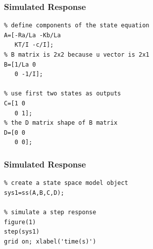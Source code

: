 \documentclass[fleqn]{beamer}                  %
\newcommand{\sectiontitleV}{Simulated Response}
\begin{document}
	\begin{frame}[containsverbatim,label=sectionV] \small
		\frametitle{\sectiontitleV}
		\begin{lstlisting}
% define components of the state equation
A=[-Ra/La -Kb/La
   KT/I -c/I];
% B matrix is 2x2 because u vector is 2x1
B=[1/La 0 
   0 -1/I];

% use first two states as outputs
C=[1 0
   0 1];
% the D matrix shape of B matrix 
D=[0 0
   0 0];
		\end{lstlisting}
	\end{frame}

	\begin{frame}[containsverbatim,label=sectionV] \small
		\frametitle{\sectiontitleV}
		\begin{lstlisting}
% create a state space model object
sys1=ss(A,B,C,D);

% simulate a step response 
figure(1)
step(sys1)
grid on; xlabel('time(s)')
		\end{lstlisting}


	\end{frame}	
\end{document}
